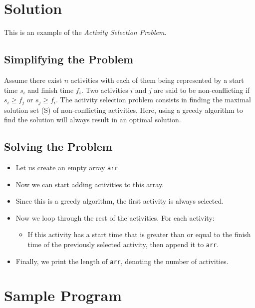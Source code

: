 \documentclass[12pt]{report}
\begin{document}
  \section*{Solution}
   This is an example of the \textit{Activity Selection Problem}.
  \subsection*{Simplifying the Problem}
  Assume there exist $n$ activities with each of them being represented by a start time $s_i$ and finish time $f_i$. Two activities $i$ and $j$ are said to be non-conflicting if $s_i \ge f_j$ or $s_j \ge f_i$. The activity selection problem consists in finding the maximal solution set (S) of non-conflicting activities. Here, using a greedy algorithm to find the solution will always result in an optimal solution.
  \subsection*{Solving the Problem}
   \begin{itemize}
    \item Let us create an empty array \texttt{arr}.
    \item Now we can start adding activities to this array.
    \item Since this is a greedy algorithm, the first activity is always selected.
    \item Now we loop through the rest of the activities. For each activity:
    \begin{itemize}
      \item If this activity has a start time that is greater than or equal to the finish time of the previously selected activity, then append it to \texttt{{arr}}.
     \end{itemize}
     \item Finally, we print the length of \texttt{arr}, denoting the number of activities.
   \end{itemize}

	\section*{Sample Program}
	
	
\end{document}
